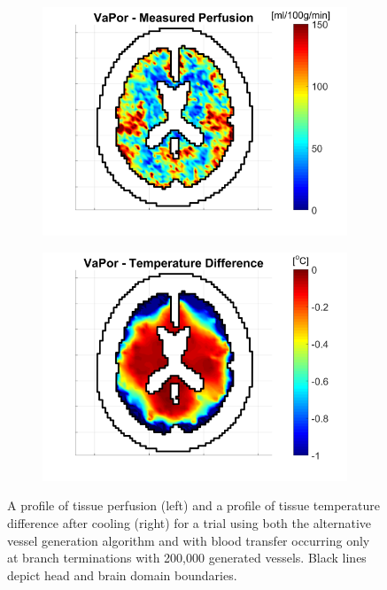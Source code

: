 \documentclass[11pt,english,a4paper,twoside,openright]{report}
\begin{document}
{{{{{{{{\begin{figure}[h]
	\centering
	\begin{subfigure}[b]{0.49\textwidth}
		\includegraphics[width=\textwidth]{Chapter5/Chapter5_1b}
	\end{subfigure}
	\begin{subfigure}[b]{0.49\textwidth}
		\includegraphics[width=\textwidth]{Chapter5/Chapter5_1a}
	\end{subfigure}
	\caption[A profile of tissue perfusion and a profile of tissue temperature difference after cooling for a trial using both the alternative vessel generation algorithm and with blood transfer occurring only at branch terminations with 200,000 generated vessels]{A profile of tissue perfusion (left) and a profile of tissue temperature difference after cooling (right) for a trial using both the alternative vessel generation algorithm and with blood transfer occurring only at branch terminations with 200,000 generated vessels. Black lines depict head and brain domain boundaries.}
	\label{fig:VascularGenerationType}
\end{figure}

}}}}}}}}
\end{document}
